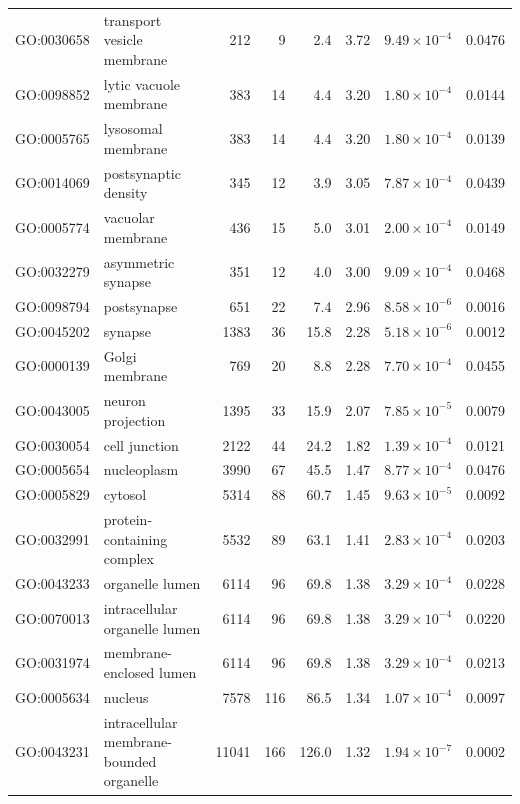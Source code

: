 \begin{table}[ht]
\begin{adjustbox}{width=\textwidth}
\begin{tabular}{llrrrrrr}
  GO:0030658 & transport vesicle membrane  & 212 & 9 & 2.4 & 3.72 & $9.49 \times 10^{-4}$ & 0.0476 \\ 
  GO:0098852 & lytic vacuole membrane  & 383 & 14 & 4.4 & 3.20 & $1.80 \times 10^{-4}$ & 0.0144 \\ 
  GO:0005765 & lysosomal membrane  & 383 & 14 & 4.4 & 3.20 & $1.80 \times 10^{-4}$ & 0.0139 \\ 
  GO:0014069 & postsynaptic density  & 345 & 12 & 3.9 & 3.05 & $7.87 \times 10^{-4}$ & 0.0439 \\ 
  GO:0005774 & vacuolar membrane  & 436 & 15 & 5.0 & 3.01 & $2.00 \times 10^{-4}$ & 0.0149 \\ 
  GO:0032279 & asymmetric synapse  & 351 & 12 & 4.0 & 3.00 & $9.09 \times 10^{-4}$ & 0.0468 \\ 
  GO:0098794 & postsynapse  & 651 & 22 & 7.4 & 2.96 & $8.58 \times 10^{-6}$ & 0.0016 \\ 
  GO:0045202 & synapse  & 1383 & 36 & 15.8 & 2.28 & $5.18 \times 10^{-6}$ & 0.0012 \\ 
  GO:0000139 & Golgi membrane  & 769 & 20 & 8.8 & 2.28 & $7.70 \times 10^{-4}$ & 0.0455 \\ 
  GO:0043005 & neuron projection  & 1395 & 33 & 15.9 & 2.07 & $7.85 \times 10^{-5}$ & 0.0079 \\ 
  GO:0030054 & cell junction  & 2122 & 44 & 24.2 & 1.82 & $1.39 \times 10^{-4}$ & 0.0121 \\ 
  GO:0005654 & nucleoplasm  & 3990 & 67 & 45.5 & 1.47 & $8.77 \times 10^{-4}$ & 0.0476 \\ 
  GO:0005829 & cytosol  & 5314 & 88 & 60.7 & 1.45 & $9.63 \times 10^{-5}$ & 0.0092 \\ 
  GO:0032991 & protein-containing complex  & 5532 & 89 & 63.1 & 1.41 & $2.83 \times 10^{-4}$ & 0.0203 \\ 
  GO:0043233 & organelle lumen  & 6114 & 96 & 69.8 & 1.38 & $3.29 \times 10^{-4}$ & 0.0228 \\ 
  GO:0070013 & intracellular organelle lumen  & 6114 & 96 & 69.8 & 1.38 & $3.29 \times 10^{-4}$ & 0.0220 \\ 
  GO:0031974 & membrane-enclosed lumen  & 6114 & 96 & 69.8 & 1.38 & $3.29 \times 10^{-4}$ & 0.0213 \\ 
  GO:0005634 & nucleus  & 7578 & 116 & 86.5 & 1.34 & $1.07 \times 10^{-4}$ & 0.0097 \\ 
  GO:0043231 & intracellular membrane-bounded organelle  & 11041 & 166 & 126.0 & 1.32 & $1.94 \times 10^{-7}$ & 0.0002 \\ 

\end{tabular}
\end{adjustbox}
\end{table}
